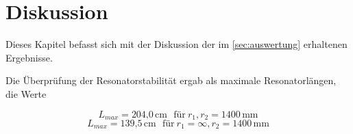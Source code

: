

\section{Diskussion}
\label{sec:Diskussion}

Dieses Kapitel befasst sich mit der Diskussion der im \autoref{sec:auswertung} erhaltenen Ergebnisse.




Die Überprüfung der Resonatorstabilität ergab als maximale Resonatorlängen, die Werte

\begin{equation}
L_{max} = \text{204,0}\,\text{cm} \ \ \ \text{für}\  r_1, r_2 = 1400\,\text{mm}
\end{equation}
\begin{equation}
L_{max} = \text{139,5}\,\text{cm} \ \ \ \text{für}\  r_1 = \infty, r_2 = 1400\,\text{mm}
\end{equation}


